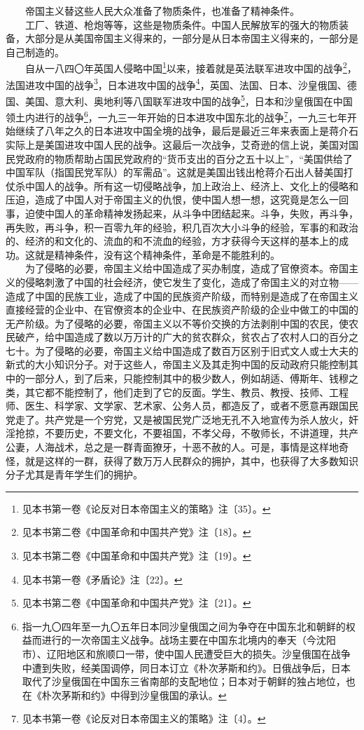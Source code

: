 \documentclass[cn,11pt,chinese]{elegantbook}
\begin{document}
　　帝国主义替这些人民大众准备了物质条件，也准备了精神条件。\\
　　工厂、铁道、枪炮等等，这些是物质条件。中国人民解放军的强大的物质装备，大部分是从美国帝国主义得来的，一部分是从日本帝国主义得来的，一部分是自己制造的。\\
　　自从一八四〇年英国人侵略中国\footnote[2]{ 见本书第一卷《论反对日本帝国主义的策略》注〔35〕。}以来，接着就是英法联军进攻中国的战争\footnote[3]{ 见本书第二卷《中国革命和中国共产党》注〔18〕。}，法国进攻中国的战争\footnote[4]{ 见本书第二卷《中国革命和中国共产党》注〔19〕。}，日本进攻中国的战争\footnote[5]{ 见本书第一卷《矛盾论》注〔22〕。}，英国、法国、日本、沙皇俄国、德国、美国、意大利、奥地利等八国联军进攻中国的战争\footnote[6]{ 见本书第二卷《中国革命和中国共产党》注〔21〕。}，日本和沙皇俄国在中国领土内进行的战争\footnote[7]{ 指一九〇四年至一九〇五年日本同沙皇俄国之间为争夺在中国东北和朝鲜的权益而进行的一次帝国主义战争。战场主要在中国东北境内的奉天（今沈阳市）、辽阳地区和旅顺口一带，使中国人民遭受巨大的损失。沙皇俄国在战争中遭到失败，经美国调停，同日本订立《朴次茅斯和约》。日俄战争后，日本取代了沙皇俄国在中国东三省南部的支配地位；日本对于朝鲜的独占地位，也在《朴次茅斯和约》中得到沙皇俄国的承认。}，一九三一年开始的日本进攻中国东北的战争\footnote[8]{ 见本书第一卷《论反对日本帝国主义的策略》注〔4〕。}，一九三七年开始继续了八年之久的日本进攻中国全境的战争，最后是最近三年来表面上是蒋介石实际上是美国进攻中国人民的战争。这最后一次战争，艾奇逊的信上说，美国对国民党政府的物质帮助占国民党政府的“货币支出的百分之五十以上”，“美国供给了中国军队（指国民党军队）的军需品”。这就是美国出钱出枪蒋介石出人替美国打仗杀中国人的战争。所有这一切侵略战争，加上政治上、经济上、文化上的侵略和压迫，造成了中国人对于帝国主义的仇恨，使中国人想一想，这究竟是怎么一回事，迫使中国人的革命精神发扬起来，从斗争中团结起来。斗争，失败，再斗争，再失败，再斗争，积一百零九年的经验，积几百次大小斗争的经验，军事的和政治的、经济的和文化的、流血的和不流血的经验，方才获得今天这样的基本上的成功。这就是精神条件，没有这个精神条件，革命是不能胜利的。\\
　　为了侵略的必要，帝国主义给中国造成了买办制度，造成了官僚资本。帝国主义的侵略刺激了中国的社会经济，使它发生了变化，造成了帝国主义的对立物——造成了中国的民族工业，造成了中国的民族资产阶级，而特别是造成了在帝国主义直接经营的企业中、在官僚资本的企业中、在民族资产阶级的企业中做工的中国的无产阶级。为了侵略的必要，帝国主义以不等价交换的方法剥削中国的农民，使农民破产，给中国造成了数以万万计的广大的贫农群众，贫农占了农村人口的百分之七十。为了侵略的必要，帝国主义给中国造成了数百万区别于旧式文人或士大夫的新式的大小知识分子。对于这些人，帝国主义及其走狗中国的反动政府只能控制其中的一部分人，到了后来，只能控制其中的极少数人，例如胡适、傅斯年、钱穆之类，其它都不能控制了，他们走到了它的反面。学生、教员、教授、技师、工程师、医生、科学家、文学家、艺术家、公务人员，都造反了，或者不愿意再跟国民党走了。共产党是一个穷党，又是被国民党广泛地无孔不入地宣传为杀人放火，奸淫抢掠，不要历史，不要文化，不要祖国，不孝父母，不敬师长，不讲道理，共产公妻，人海战术，总之是一群青面獠牙，十恶不赦的人。可是，事情是这样地奇怪，就是这样的一群，获得了数万万人民群众的拥护，其中，也获得了大多数知识分子尤其是青年学生们的拥护。\\
\end{document}
